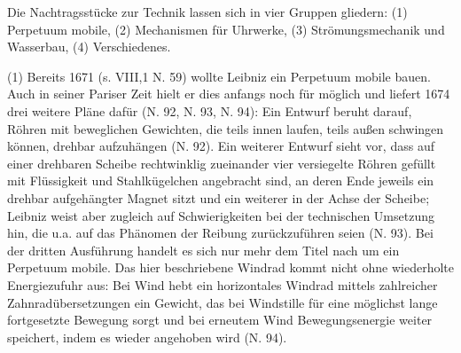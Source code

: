 \par
Die Nachtragsstücke zur Technik lassen sich in vier Gruppen gliedern: (1) Perpetuum mobile, (2) Mechanismen für Uhrwerke, (3) Strömungsmechanik und Wasserbau, (4) Verschiedenes.
\par
(1) Bereits 1671 (s. VIII,1 N. 59) wollte Leibniz ein Perpetuum mobile bauen. Auch in seiner Pariser Zeit hielt er dies anfangs noch für möglich und liefert 1674 drei weitere Pläne dafür (N. 92, N. 93, N. 94): Ein Entwurf beruht darauf, Röhren mit beweglichen Gewichten, die teils innen laufen, teils au{\ss}en schwingen können, drehbar aufzuhängen (N. 92). Ein weiterer Entwurf sieht vor, dass auf einer drehbaren Scheibe rechtwinklig zueinander vier versiegelte Röhren gefüllt mit Flüssigkeit und Stahlkügelchen angebracht sind, an deren Ende jeweils ein drehbar aufgehängter Magnet sitzt und ein weiterer in der Achse der Scheibe; Leibniz weist aber zugleich auf Schwierigkeiten bei der technischen Umsetzung hin, die u.a. auf das Phänomen der Reibung zurückzuführen seien (N. 93). Bei der dritten Ausführung handelt es sich nur mehr dem Titel nach um ein Perpetuum mobile. Das hier beschriebene Windrad kommt nicht ohne wiederholte Energiezufuhr aus: Bei Wind hebt ein horizontales Windrad mittels zahlreicher Zahnradübersetzungen ein Gewicht, das bei Windstille für eine möglichst lange fortgesetzte Bewegung sorgt und bei erneutem Wind Bewegungsenergie weiter speichert, indem es wieder angehoben wird (N. 94). 
\par
